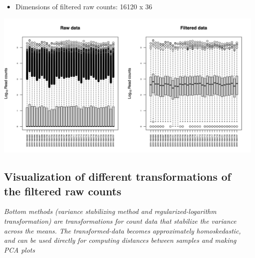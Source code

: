 \documentclass[
]{book}
\providecommand{\tightlist}{%
  \setlength{\itemsep}{0pt}\setlength{\parskip}{0pt}}
\begin{document}
\begin{itemize}
\tightlist
\item
  Dimensions of filtered raw counts: 16120 x 36
\end{itemize}

\includegraphics{images/readCounts_byGene_rawVsFiltered.png}

\hypertarget{visualization-of-different-transformations-of-the-filtered-raw-counts}{%
\subsection{Visualization of different transformations of the filtered raw counts}\label{visualization-of-different-transformations-of-the-filtered-raw-counts}}

\emph{Bottom methods (variance stabilizing method and regularized-logarithm transformation) are transformations for count data that stabilize the variance across the means. The transformed-data becomes approximately homoskedastic, and can be used directly for computing distances between samples and making PCA plots}
\end{document}
